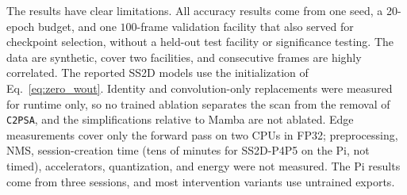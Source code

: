 The results have clear limitations. All accuracy results come from one seed, a 20-epoch budget, and one $100$-frame validation facility that also served for checkpoint selection, without a held-out test facility or significance testing. The data are synthetic, cover two facilities, and consecutive frames are highly correlated. The reported SS2D models use the initialization of Eq.~\eqref{eq:zero_wout}. Identity and convolution-only replacements were measured for runtime only, so no trained ablation separates the scan from the removal of \texttt{C2PSA}, and the simplifications relative to Mamba are not ablated. Edge measurements cover only the forward pass on two CPUs in FP32; preprocessing, NMS, session-creation time (tens of minutes for SS2D-P4P5 on the Pi, not timed), accelerators, quantization, and energy were not measured. The Pi results come from three sessions, and most intervention variants use untrained exports.
